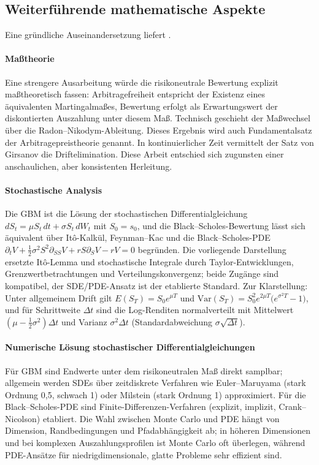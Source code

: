 \subsection{Weiterführende mathematische Aspekte}
Eine gründliche Auseinandersetzung liefert \cite{shreve}.

\paragraph{Maßtheorie}
Eine strengere Ausarbeitung würde die risikoneutrale Bewertung explizit maßtheoretisch fassen: 
Arbitragefreiheit entspricht der Existenz eines äquivalenten Martingalmaßes, Bewertung erfolgt als 
Erwartungswert der diskontierten Auszahlung unter diesem Maß. Technisch geschieht der 
Maßwechsel über die Radon–Nikodym-Ableitung. Dieses Ergebnis wird auch Fundamentalsatz der Arbitragepreistheorie genannt. 
In kontinuierlicher Zeit vermittelt der Satz von Girsanov die Driftelimination. Diese Arbeit entschied sich zugunsten einer anschaulichen, aber 
konsistenten Herleitung.

\paragraph{Stochastische Analysis}
Die GBM ist die Lösung der stochastischen Differentialgleichung
$dS_t=\mu S_t\,dt+\sigma S_t\,dW_t$ mit $S_0=s_0$,
und die Black–Scholes-Bewertung lässt sich äquivalent über It\^o-Kalkül, Feynman–Kac und die Black–Scholes-PDE
$\partial_t V+\tfrac12\sigma^2 S^2 \partial_{SS}V + r S \partial_S V - r V=0$
begründen. Die vorliegende Darstellung ersetzte It\^o-Lemma und stochastische Integrale durch Taylor-Entwicklungen, Grenzwertbetrachtungen und 
Verteilungskonvergenz; beide Zugänge sind kompatibel, der SDE/PDE-Ansatz ist der etablierte Standard. 
Zur Klarstellung: Unter allgemeinem Drift gilt $E(S_T)=S_0 e^{\mu T}$ und $\mathrm{Var}(S_T)=S_0^2 e^{2\mu T}\big(e^{\sigma^2 T}-1\big)$, 
und für Schrittweite $\Delta t$ sind die Log-Renditen normalverteilt mit Mittelwert $(\mu-\tfrac12\sigma^2)\Delta t$ und 
Varianz $\sigma^2 \Delta t$ (Standardabweichung $\sigma\sqrt{\Delta t}$).

\paragraph{Numerische Lösung stochastischer Differentialgleichungen}
Für GBM sind Endwerte unter dem risikoneutralen Maß direkt samplbar; allgemein werden SDEs über 
zeitdiskrete Verfahren wie Euler–Maruyama (stark Ordnung 0{,}5, schwach 1) oder 
Milstein (stark Ordnung 1) approximiert. Für die Black–Scholes-PDE sind 
Finite-Differenzen-Verfahren (explizit, implizit, Crank–Nicolson) etabliert. Die Wahl zwischen 
Monte Carlo und PDE hängt von Dimension, Randbedingungen und Pfadabhängigkeit ab; in höheren 
Dimensionen und bei komplexen Auszahlungsprofilen ist Monte Carlo oft überlegen, während 
PDE-Ansätze für niedrigdimensionale, glatte Probleme sehr effizient sind.

